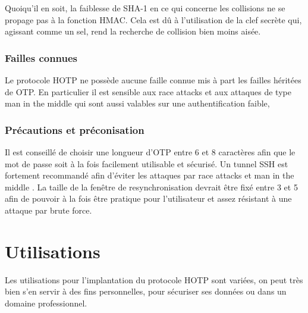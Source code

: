 \documentclass{../res/univ-projet}
\begin{document}
    Quoiqu'il en soit, la faiblesse de SHA-1 en ce qui concerne les collisions ne se propage pas à la fonction HMAC. Cela est dû à l'utilisation de la clef secrète
    qui, agissant comme un sel, rend la recherche de collision bien moins aisée.
    
    \subsubsection{Failles connues}
    Le protocole HOTP ne possède aucune faille connue mis à part les failles héritées de OTP.
    En particulier il est sensible aux \og race attacks \fg{} et aux attaques de type \og man in the middle \fg{} qui sont aussi valables sur une  authentification faible, 
    
    \subsubsection{Précautions et préconisation}
    Il est conseillé de choisir une longueur d'OTP entre 6 et 8 caractères afin que le mot de passe soit à la fois facilement utilisable et sécurisé.
    Un tunnel SSH est fortement recommandé afin d'éviter les attaques par \og race attacks \fg{} et \og man in the middle \fg{}.
    La taille de la fenêtre de resynchronisation devrait être fixé entre 3 et 5 afin de pouvoir à la fois être pratique pour l'utilisateur et assez résistant
    à une attaque par brute force.
    
\section{Utilisations}
Les utilisations pour l'implantation du protocole HOTP sont variées, on peut très bien s'en servir à des fins personnelles, pour sécuriser ses données ou 
dans un domaine professionnel.
\end{document}
